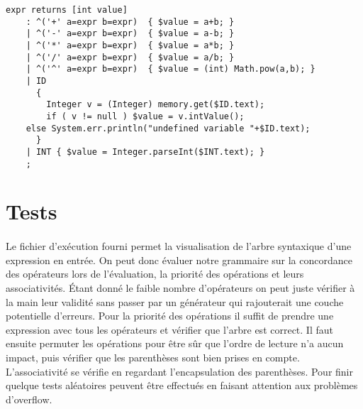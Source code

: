 \documentclass[paper=a4, fontsize=11pt]{scrartcl} %
\numberwithin{equation}{section} %
\numberwithin{figure}{section} %
\numberwithin{table}{section} %
\begin{document}
\begin{lstlisting}[label=eval_file,caption=Fichier Eval.g,
linebackgroundcolor={\lstcolorlines[orange!30]{6}\lstcolorlines[blue!30]{5}}]
expr returns [int value]
    : ^('+' a=expr b=expr)  { $value = a+b; }
    | ^('-' a=expr b=expr)  { $value = a-b; }
    | ^('*' a=expr b=expr)  { $value = a*b; }
    | ^('/' a=expr b=expr)  { $value = a/b; }
    | ^('^' a=expr b=expr)  { $value = (int) Math.pow(a,b); }
    | ID
      {
        Integer v = (Integer) memory.get($ID.text);
        if ( v != null ) $value = v.intValue();
	else System.err.println("undefined variable "+$ID.text);
      }
    | INT { $value = Integer.parseInt($INT.text); }
    ;
\end{lstlisting}




\section{Tests} %

\paragraph{}Le fichier d'exécution fourni permet la visualisation de l'arbre syntaxique
d'une expression en entrée. On peut donc évaluer notre grammaire sur la
concordance des opérateurs lors de l'évaluation, la priorité des opérations et
leurs associativités. Étant donné le faible nombre d'opérateurs on peut juste
vérifier à la main leur validité sans passer par un générateur qui rajouterait
une couche potentielle d'erreurs. Pour la priorité des opérations il suffit de
prendre une expression avec tous les opérateurs et vérifier que l'arbre est
correct. Il faut ensuite permuter les opérations pour être sûr que l'ordre de
lecture n'a aucun impact, puis vérifier que les parenthèses sont bien prises en
compte. L'associativité se vérifie en regardant l'encapsulation des parenthèses.
Pour finir quelque tests aléatoires peuvent être effectués en faisant attention
aux problèmes d'overflow.

\end{document}
